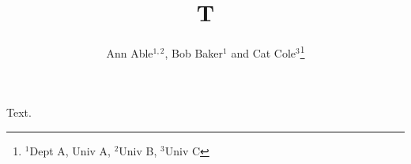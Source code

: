 \documentclass{article}
\begin{document}
\title{T}
\author{Ann Able$^{1,2}$, Bob Baker$^{1}$ and Cat Cole$^{3}$\thanks{$^{1}$Dept A, Univ A, $^{2}$Univ B, $^{3}$Univ C}}
\maketitle
Text.
\end{document}
